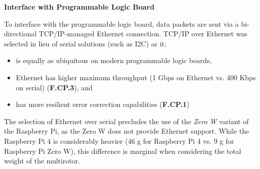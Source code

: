 \textbf{Interface with Programmable Logic Board}

To interface with the programmable logic board, data packets are sent via a bi-directional TCP/IP-managed Ethernet connection. TCP/IP over Ethernet was selected in lieu of serial solutions (such as I2C) as it:
\begin{itemize}
\item is equally as ubiquitous on modern programmable logic boards,
\item Ethernet has higher maximum throughput (1 Gbps on Ethernet vs. 400 Kbps on serial) (\textbf{F.CP.3}), and
\item has more resilient error correction capabilities (\textbf{F.CP.1})
\end{itemize} 

The selection of Ethernet over serial precludes the use of the \textit{Zero W} variant of the Raspberry Pi, as the Zero W does not provide Ethernet support. While the Raspberry Pi 4 is considerably heavier (46 g for Raspberry Pi 4 vs. 9 g for Raspberry Pi Zero W), this difference is marginal when considering the total weight of the multirotor.
